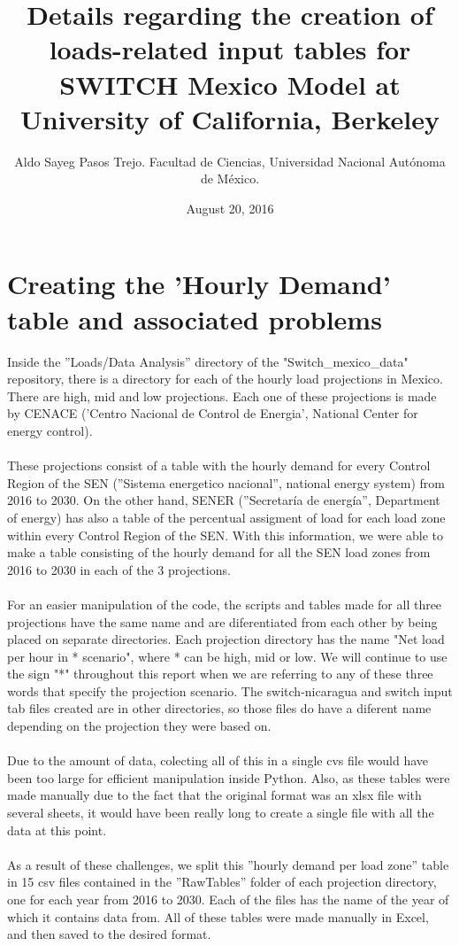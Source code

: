 \documentclass{article}
\author{Aldo Sayeg Pasos Trejo. Facultad de Ciencias, Universidad Nacional Autónoma de México.}
\date{August 20, 2016}
\title{Details regarding the creation of loads-related input tables for SWITCH Mexico Model at University of California, Berkeley}
\begin{document}
\maketitle
\section{Creating the 'Hourly Demand' table and associated problems}
Inside the ''Loads/Data Analysis'' directory of the "Switch\_mexico\_data" repository, there is a directory for each of the hourly load projections in Mexico. There are high, mid and low projections. Each one of these projections is made by CENACE ('Centro Nacional de Control de Energia', National Center for energy control)\cite{pagina1}. 
\\
\\These projections consist of a table with the hourly demand for every Control Region of the SEN (''Sistema energetico nacional'', national energy system) from 2016 to 2030. On the other hand, SENER (''Secretaría de energía'', Department of energy) has also a table of the percentual assigment of load for each load zone within every Control Region of the SEN. With this information, we were able to make a table consisting of the hourly demand for all the SEN load zones from 2016 to 2030 in each of the 3 projections. 
\\
\\For an easier manipulation of the code, the scripts and tables made for all three projections have the same name and are diferentiated from each other by being placed on separate directories. Each projection directory has the name "Net load per hour in * scenario", where * can be high, mid or low. We will continue to use the sign "*" throughout this report when we are referring to any of these three words that specify the projection scenario. The switch-nicaragua and switch input tab files created are in other directories, so those files do have a diferent name depending on the projection they were based on.
\\
\\Due to the amount of data, colecting all of this in a single cvs file would have been too large for efficient manipulation inside Python. Also, as these tables were made manually due to the fact that the original format was an xlsx file with several sheets, it would have been really long to create a single file with all the data at this point. 
\\
\\As a result of these challenges, we split this ''hourly demand per load zone'' table in 15 csv files contained in the ''RawTables'' folder of each projection directory, one for each year from 2016 to 2030. Each of the files has the name of the year of which it contains data from. All of these tables were made manually in Excel, and then saved to the desired format.
\end{document}
